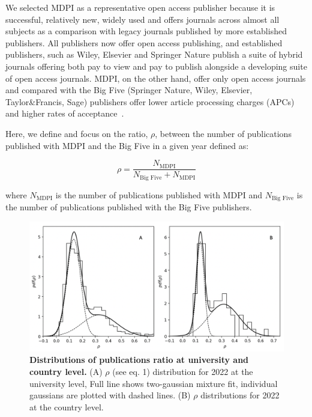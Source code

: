 \documentclass[amsfonts, amssymb, prl, superscriptaddress, notitlepage, twocolumn, nofootinbib]{revtex4-2}
\begin{document}
We selected MDPI as a representative open access publisher because it is successful, relatively new, widely used and offers journals across almost all subjects as a comparison with legacy journals published by more established publishers. All publishers now offer open access publishing, and established publishers, such as Wiley, Elsevier and Springer Nature publish a suite of hybrid journals offering both pay to view and pay to publish alongside a developing suite of open access journals. MDPI, on the other hand, offer only open access journals and compared with the Big Five (Springer Nature, Wiley, Elsevier, Taylor\&Francis, Sage) publishers offer lower article processing charges (APCs) and higher rates of acceptance~\cite{fillon2024should}. 

Here, we define and focus on the ratio, $\rho$, between the number of publications published with MDPI and the Big Five in a given year defined as: 

\begin{equation}
\rho = \frac{N_{\text{MDPI}}}{N_{\text{Big Five}}+N_{\text{MDPI}}}
\end{equation}

where $N_{\text{MDPI}}$ is the number of publications published with MDPI and $N_{\text{Big Five}}$ is the number of publications published with the Big Five publishers.

\begin{figure}
\centering
\includegraphics[width=1.0\linewidth]{Fig01f.png}
\caption{\label{fig:fig1} {\bf Distributions of publications ratio at university and country level.} (A) $\rho$ (see eq. 1) distribution for 2022 at the university level, Full line shows two-gaussian mixture fit, individual gaussians are plotted with dashed lines. (B) $\rho$ distributions for 2022 at the country level.
}
\end{figure}
\end{document}
